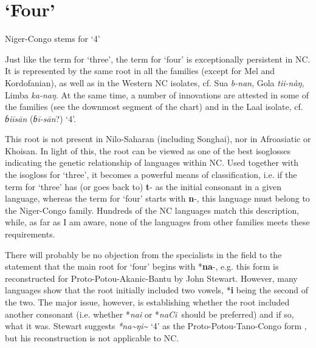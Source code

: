 \section{‘Four’}%
\begin{table}
\caption{\label{tab:4:13}Niger-Congo stems for `4'}
\kppyramid
{}




 
\end{table}

Just like the term for ‘three’, the term for ‘four’ is exceptionally persistent in NC. It is represented by the same root in all the families (except for Mel and Kordofanian), as well as in the Western NC isolates, cf. Sua \textit{b-nan}, Gola \textit{tii-nàŋ}, Limba \textit{ka-naŋ}. At the same time, a number of innovations are attested in some of the families (see the downmost segment of the chart) and in the Laal isolate, cf. \textit{ɓi\={i}s\={a}n} (\textit{ɓ\={i}-s\={a}n}?) ‘4’.

This root is not present in Nilo-Saharan (including Songhai), nor in Afroasiatic or Khoisan. In light of this, the root can be viewed as one of the best isoglosses indicating the genetic relationship of languages within NC. Used together with the isogloss for ‘three’, it becomes a powerful means of classification, i.e. if the term for ‘three’ has (or goes back to) \textbf{t}- as the initial consonant in a given language, whereas the term for ‘four’ starts with \textbf{n}-, this language must belong to the Niger-Congo family. Hundreds of the NC languages match this description, while, as far as I am aware, none of the languages from other families meets these requirements.

There will probably be no objection from the specialists in the field to the statement that the main root for ‘four’ begins with *\textbf{na}-, e.g. this form is reconstructed for Proto-Potou-Akanic-Bantu by John Stewart. However, many languages show that the root initially included two vowels, *\textbf{i} being the second of the two. The major issue, however, is establishing whether the root included another consonant (i.e. whether *\textit{nai} or *\textit{naCi~}should be preferred) and if so, what it was. Stewart suggests \textit{*na\~{}ŋi\~{}}  ‘4’ as the Proto-Potou-Tano-Congo form \citep{Stewart1983}, but his reconstruction is not applicable to NC.

